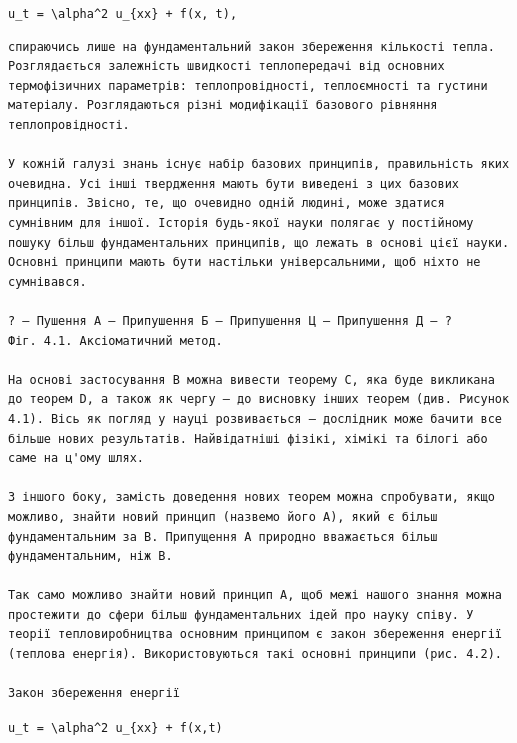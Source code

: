 \documentclass[
  ukrainian,
]{article}
\begin{document}
\texttt{u\_t\ =\ \textbackslash{}alpha\^{}2\ u\_\{xx\}\ +\ f(x,\ t),}

\begin{verbatim}
спираючись лише на фундаментальний закон збереження кількості тепла. Розглядається залежність швидкості теплопередачі від основних термофізичних параметрів: теплопровідності, теплоємності та густини матеріалу. Розглядаються різні модифікації базового рівняння теплопровідності.

У кожній галузі знань існує набір базових принципів, правильність яких очевидна. Усі інші твердження мають бути виведені з цих базових принципів. Звісно, те, що очевидно одній людині, може здатися сумнівним для іншої. Історія будь-якої науки полягає у постійному пошуку більш фундаментальних принципів, що лежать в основі цієї науки. Основні принципи мають бути настільки універсальними, щоб ніхто не сумнівався.

? – Пушення А – Припушення Б – Припушення Ц – Припушення Д – ?
Фіг. 4.1. Аксіоматичний метод.

На основі застосування B можна вивести теорему C, яка буде викликана до теорем D, а також як чергу — до висновку інших теорем (див. Рисунок 4.1). Вісь як погляд у науці розвивається — дослідник може бачити все більше нових результатів. Найвідатніші фізікі, хімікі та білогі або саме на ц'ому шлях.

З іншого боку, замість доведення нових теорем можна спробувати, якщо можливо, знайти новий принцип (назвемо його A), який є більш фундаментальним за B. Припущення A природно вважається більш фундаментальним, ніж B.

Так само можливо знайти новий принцип А, щоб межі нашого знання можна простежити до сфери більш фундаментальних ідей про науку співу. У теорії тепловиробництва основним принципом є закон збереження енергії (теплова енергія). Використовуються такі основні принципи (рис. 4.2).

Закон збереження енергії
\end{verbatim}

\texttt{u\_t\ =\ \textbackslash{}alpha\^{}2\ u\_\{xx\}\ +\ f(x,t)}
\end{document}
